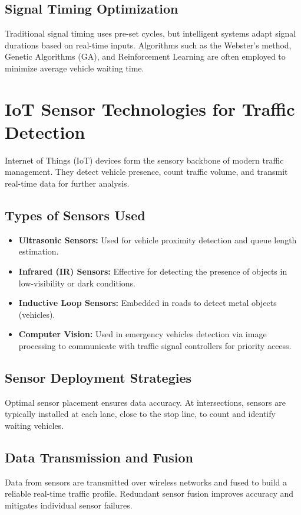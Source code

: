 \documentclass[12pt]{report}
\begin{document}
\subsection{Signal Timing Optimization}
Traditional signal timing uses pre-set cycles, but intelligent systems adapt signal durations based on real-time inputs. Algorithms such as the Webster’s method, Genetic Algorithms (GA), and Reinforcement Learning are often employed to minimize average vehicle waiting time.

\section{IoT Sensor Technologies for Traffic Detection}

Internet of Things (IoT) devices form the sensory backbone of modern traffic management. They detect vehicle presence, count traffic volume, and transmit real-time data for further analysis.

\subsection{Types of Sensors Used}

\begin{itemize}
    \item \textbf{Ultrasonic Sensors:} Used for vehicle proximity detection and queue length estimation.
    \item \textbf{Infrared (IR) Sensors:} Effective for detecting the presence of objects in low-visibility or dark conditions.
    \item \textbf{Inductive Loop Sensors:} Embedded in roads to detect metal objects (vehicles).
    \item \textbf{Computer Vision:} Used in emergency vehicles detection via image processing to communicate with traffic signal controllers for priority access.
\end{itemize}

\subsection{Sensor Deployment Strategies}
Optimal sensor placement ensures data accuracy. At intersections, sensors are typically installed at each lane, close to the stop line, to count and identify waiting vehicles.

\subsection{Data Transmission and Fusion}
Data from sensors are transmitted over wireless networks and fused to build a reliable real-time traffic profile. Redundant sensor fusion improves accuracy and mitigates individual sensor failures.
\end{document}

